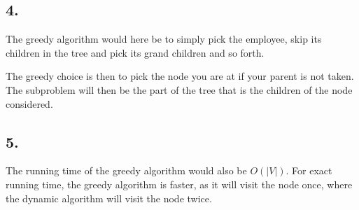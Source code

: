 \documentclass[12pt,a4paper]{report}
\begin{document}
\subsection*{4.}
The greedy algorithm would here be to simply pick the employee, skip its children in the tree and pick its grand children and so forth.

The greedy choice is then  to pick the node you are at if your parent is not taken.
The subproblem will then be the part of the tree that is the children of the node considered.

\subsection*{5.}
The running time of the greedy algorithm would also be $O(|V|)$. For exact running time, the greedy algorithm is faster, as it will visit the node once, where the dynamic algorithm will visit the node twice.
\end{document}
